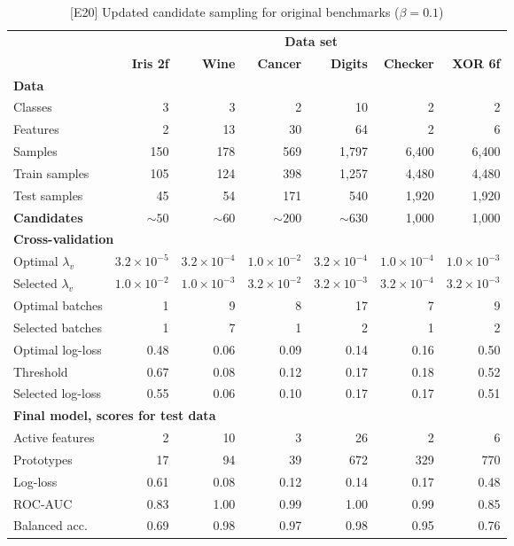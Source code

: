 %
\begin{table}
\caption{[E20] Updated candidate sampling for original benchmarks ($\beta=0.1$)}
\label{tab_e20}
%
\begin{center}
\small
\begin{tabular}{|lrrrrrr|}
\hline
&\multicolumn{6}{c|}{\textbf{\hrulefill\ Data set \hrulefill}}\\
&\textbf{Iris 2f}&\textbf{Wine}&\textbf{Cancer}&\textbf{Digits}&\textbf{Checker}&\textbf{XOR 6f}\\
\multicolumn{7}{|l|}{\textbf{Data}}\\
Classes&3&3&2&10&2&2\\
Features&2&13&30&64&2&6\\
Samples&150&178&569&1,797&6,400&6,400\\
Train samples&105&124&398&1,257&4,480&4,480\\
Test samples&45&54&171&540&1,920&1,920\\
\textbf{Candidates}&$\sim50$&$\sim60$&$\sim200$&$\sim630$&1,000&1,000\\
\multicolumn{7}{|l|}{\textbf{Cross-validation}}\\
Optimal $\lambda_v$&$3.2\times10^{-5}$&$3.2\times10^{-4}$&$1.0\times10^{-2}$&$3.2\times10^{-4}$&$1.0\times10^{-4}$&$1.0\times10^{-3}$\\
Selected $\lambda_v$&$1.0\times10^{-2}$&$1.0\times10^{-3}$&$3.2\times10^{-2}$&$3.2\times10^{-3}$&$3.2\times10^{-4}$&$3.2\times10^{-3}$\\
Optimal batches&1&9&8&17&7&9\\
Selected batches&1&7&1&2&1&2\\
Optimal log-loss&0.48&0.06&0.09&0.14&0.16&0.50\\
Threshold&0.67&0.08&0.12&0.17&0.18&0.52\\
Selected log-loss&0.55&0.06&0.10&0.17&0.17&0.51\\
\multicolumn{7}{|l|}{\textbf{Final model, scores for test data}}\\
Active features&2&10&3&26&2&6\\
Prototypes&17&94&39&672&329&770\\
Log-loss&0.61&0.08&0.12&0.14&0.17&0.48\\
ROC-AUC&0.83&1.00&0.99&1.00&0.99&0.85\\
Balanced acc.&0.69&0.98&0.97&0.98&0.95&0.76\\
\hline
\end{tabular}
\end{center}
\end{table}

